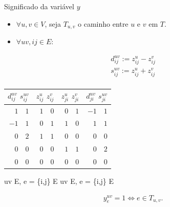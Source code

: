 \documentclass[dvipsnames]{beamer}
\begin{document}
\begin{frame}{Significado da variável $y$ \hyperlink{form_1}{\beamergotobutton{$\leftarrow$}}}
  \hypertarget{sig_y}{}
  {\footnotesize
  \begin{itemize}
    \item $\forall u,v \in V$, seja $T_{u,v}$ o caminho entre $u$ e $v$ em $T$.
    \item $\forall uv,ij \in E$:
  \end{itemize}
\begin{align*}
  d^{u v}_{ij} := z^{u}_{ij} - z^{v}_{ij}\\
  s^{u v}_{ij} := z^{u}_{ij} + z^{v}_{ij}\\
  \end{align*}

\begin{center}
  \noindent
  \label{tab:sum_diff} 
\begin{tabular}{|r|r|r|r|}\hline
{$d^{uv}_{ij}$ $s^{uv}_{ij}$} & {$z^{u}_{ij}$ $z^{v}_{ij}$} & {$z^{u}_{ji}$ $z^{v}_{ji}$} & {$d^{uv}_{ji}$ $s^{uv}_{ji}$}
\\ \hline\hline 
$1\quad 1$ & $1\quad 0$ & $0\quad 1$ & $-1\quad 1$ \\
$-1\quad 1$ & $0\quad 1$ & $1\quad 0$ & $1\quad 1$ \\
$0\quad 2$ & $1\quad 1$ & $0\quad 0$ & $0\quad 0$ \\
$0\quad 0$ & $0\quad 0$ & $1\quad 1$ & $0\quad 2$ \\
$0\quad 0$ & $0\quad 0$ & $0\quad 0$ & $0\quad 0$ \\
\hline\hline
\end{tabular}
\end{center}


\begin{lpformulation}[]
   {uv \in E, \forall e = \{i,j\} \in E}
   {uv \in E, \forall e = \{i,j\} \in E}
\end{lpformulation}

\begin{align}
  \label{afirm:valor_y}
  y^{uv}_e = 1 \Leftrightarrow e \in T_{u,v}.
\end{align}
}

\end{frame}
\end{document}
